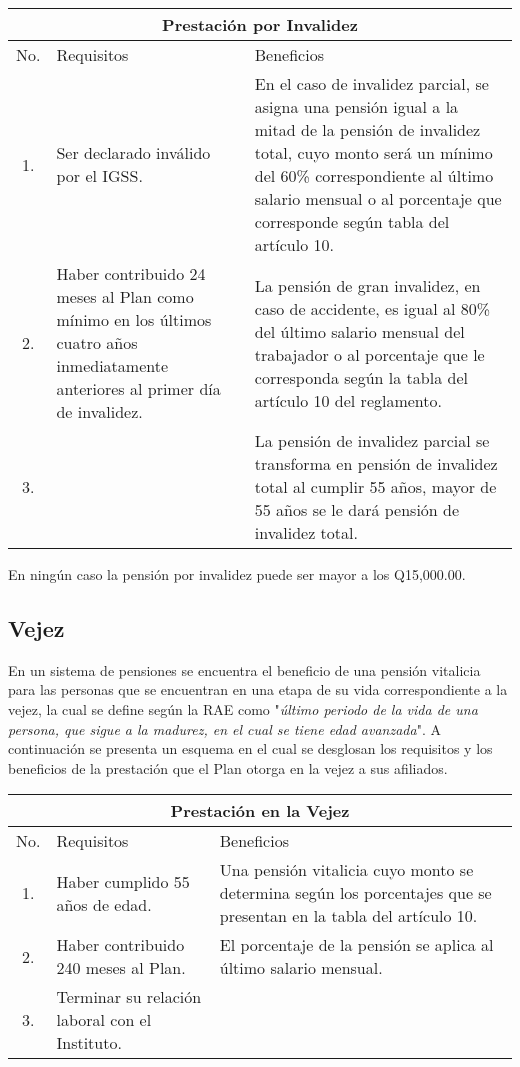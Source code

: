 \documentclass[12pt,letterpaper,titlepage]{article}
\begin{document}
{\begin{center}
	\begin{tabular}{|c||p{5cm}||p{7cm}|}
	\hline 
	\multicolumn{3}{|c|}{Prestación por Invalidez} \\ 
	\hline 
	\hline 
	No. & Requisitos & Beneficios \\ 
	\cline {1-1}
	\cline {2-2}
	\cline {3-3}
	1. & Ser declarado inválido por el IGSS. &   En el caso de invalidez parcial, se asigna una pensión igual a la mitad de la pensión de invalidez total, cuyo monto será un mínimo del 60\% correspondiente al último salario mensual o al porcentaje que corresponde según tabla del artículo 10.\\ 
	\hline 
	2. &  Haber contribuido 24 meses al Plan como mínimo en los últimos cuatro años inmediatamente anteriores al primer día de invalidez. & La pensión de gran invalidez, en caso de accidente, es igual al 80\% del último salario mensual del trabajador o al porcentaje que le corresponda según la tabla del artículo 10 del reglamento. \\ 
	\hline 
	3. & & La pensión de invalidez parcial se transforma en pensión de invalidez total al cumplir 55 años, mayor de 55 años se le dará pensión de invalidez total.\\
	\hline
\end{tabular} 
\end{center}

En ningún caso la pensión por invalidez puede ser mayor a los Q15,000.00.

\subsection{Vejez}

En un sistema de pensiones se encuentra el beneficio de una pensión vitalicia para las personas que se encuentran en una etapa de su vida correspondiente a la vejez, la cual se define según la RAE como "\textit{último periodo de la vida de una persona, que sigue a la madurez, en el cual se tiene edad avanzada}". A continuación se presenta un esquema en el cual se desglosan los requisitos y los beneficios de la prestación que el Plan otorga en la vejez a sus afiliados.


\begin{center}
	\begin{tabular}{|c||p{5cm}||p{6cm}|}
		\hline 
		\multicolumn{3}{|c|}{Prestación en la Vejez} \\ 
		\hline 
		\hline
		\rule[-1ex]{0pt}{2.5ex} No. & Requisitos &  Beneficios \\ 
		\hline 
		\rule[-1ex]{0pt}{2.5ex} 1. & Haber cumplido 55 años de edad. & Una pensión vitalicia cuyo monto se determina según los porcentajes que se presentan en la tabla del artículo 10. \\ 
		\hline 
		\rule[-1ex]{0pt}{2.5ex} 2. & Haber contribuido 240 meses al Plan. & El porcentaje de la pensión se aplica al último salario mensual. \\ 
		\hline 
		\rule[-1ex]{0pt}{2.5ex} 3. & Terminar su relación laboral con el Instituto. &  \\ 
		\hline 
	\end{tabular} 
\end{center} 

}
\end{document}
